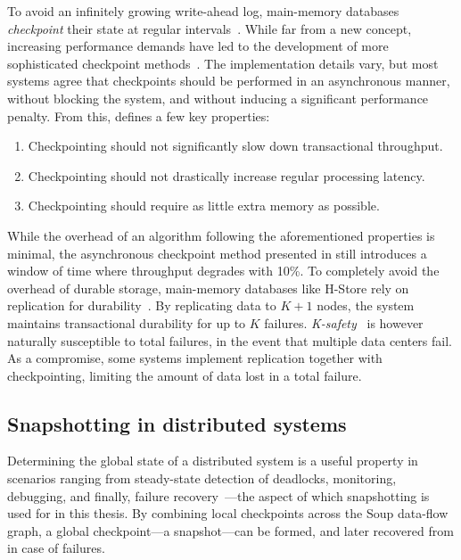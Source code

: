 To avoid an infinitely growing write-ahead log, main-memory databases
\textit{checkpoint} their state at regular intervals~\cite{main-memory, dali,
margaret, voltdb-recovery, hekaton}. While far from a new concept, increasing
performance demands have led to the development of more sophisticated checkpoint
methods~\cite{memory-checkpoint, siren}. The implementation details vary, but
most systems agree that checkpoints should be performed in an asynchronous
manner, without blocking the system, and without inducing a significant
performance penalty. From this, \cite{memory-checkpoint} defines a few key
properties:

\begin{enumerate}
  \item Checkpointing should not significantly slow down transactional throughput.
  \item Checkpointing should not drastically increase regular processing latency.
  \item Checkpointing should require as little extra memory as possible.
\end{enumerate}

While the overhead of an algorithm following the aforementioned properties is
minimal, the asynchronous checkpoint method presented in
\cite{memory-checkpoint} still introduces a window of time where throughput
degrades with 10\%. To completely avoid the overhead of durable storage,
main-memory databases like H-Store rely on replication for
durability~\cite{hstore}. By replicating data to $ K + 1 $ nodes, the system
maintains transactional durability for up to $ K $ failures.
\textit{K-safety}~\cite{cstore} is however naturally susceptible to total
failures, \eg in the event that multiple data centers fail. As a compromise,
some systems implement replication together with checkpointing, limiting the
amount of data lost in a total failure.

\subsection{Snapshotting in distributed systems}\label{sec:rel-snapshotting}

Determining the global state of a distributed system is a useful property in
scenarios ranging from steady-state detection of deadlocks, monitoring,
debugging, and finally, failure recovery~\cite{intro-snapshot}---the aspect of
which snapshotting is used for in this thesis. By combining local checkpoints
across the Soup data-flow graph, a global checkpoint---a snapshot---can be
formed, and later recovered from in case of failures.

